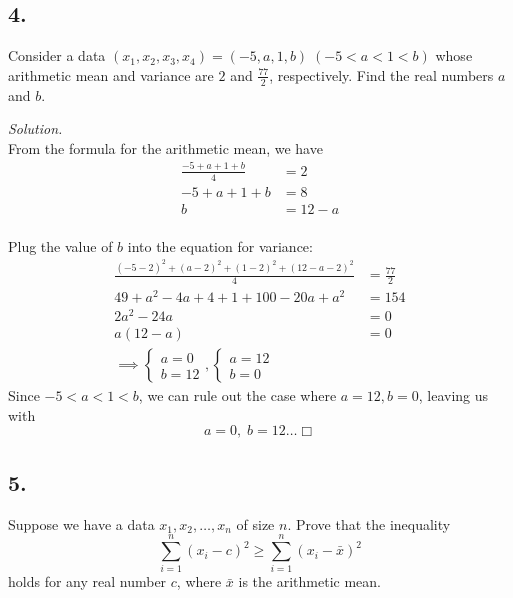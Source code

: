 \documentclass[
]{article}
\begin{document}
\hypertarget{section-3}{%
\subsection{4.}\label{section-3}}

Consider a data
\((x_1, x_2, x_3, x_4) = (-5, a, 1, b) \;(-5 < a < 1 < b)\) whose
arithmetic mean and variance are \(2\) and \(\frac{77}{2}\),
respectively. Find the real numbers \(a\) and \(b\).

\textit{Solution.}\\
From the formula for the arithmetic mean, we have \[\begin{aligned}
\frac{-5 + a + 1 + b}{4} &= 2 \\
-5 + a + 1 + b &= 8 \\
b &= 12 - a\\
\end{aligned}\]

Plug the value of \(b\) into the equation for variance:
\[\begin{aligned}
\frac{(-5 - 2)^2 + (a-2)^2 + (1-2)^2 + (12-a-2)^2}{4} &= \frac{77}{2}\\
49 + a^2 -4a + 4 + 1 + 100 - 20a + a^2 &= 154 \\
2a^2 - 24a &= 0 \\
a(12-a) &= 0 \\
\implies \begin{cases}a = 0 \\ b = 12 \end{cases}, \begin{cases} a = 12 \\ b = 0 \end{cases}&
\end{aligned}\] Since \(-5 < a < 1 < b\), we can rule out the case where
\(a = 12, b = 0\), leaving us with \[a = 0, \;b = 12\dots \Box\]

\hypertarget{section-4}{%
\subsection{5.}\label{section-4}}

Suppose we have a data \(x_1, x_2, \dots , x_n\) of size \(n\). Prove
that the inequality
\[\sum_{i=1}^n(x_i-c)^2 \ge \sum_{i=1}^n(x_i-\bar{x})^2\] holds for any
real number \(c\), where \(\bar{x}\) is the arithmetic mean.
\end{document}
